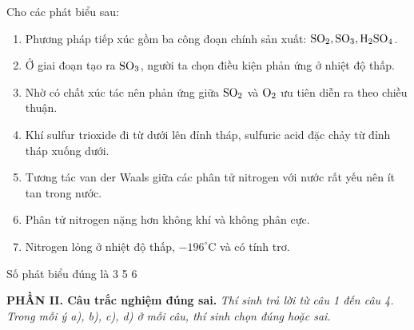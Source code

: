 \documentclass[12pt,a4paper]{article}
\begin{document}
\begin{ex}
Cho các phát biểu sau:
\begin{enumerate}[(1)]
	\item Phương pháp tiếp xúc gồm ba công đoạn chính sản xuất: $\ce{SO2, SO3, H2SO4}$.
	\item Ở giai đoạn tạo ra $\ce{SO3}$, người ta chọn điều kiện phản ứng ở nhiệt độ thấp.
	\item Nhờ có chất xúc tác nên phản ứng giữa $\ce{SO2}$ và $\ce{O2}$ ưu tiên diễn ra theo chiều thuận.
	\item Khí sulfur trioxide đi từ dưới lên đỉnh tháp, sulfuric acid đặc chảy từ đỉnh tháp xuống dưới.
	\item Tương tác van der Waals giữa các phân tử nitrogen với nước rất yếu nên ít tan trong nước.
	\item Phân tử nitrogen nặng hơn không khí và không phân cực.
	\item Nitrogen lỏng ở nhiệt độ thấp, $-196^\circ\text{C}$ và có tính trơ.
\end{enumerate}
Số phát biểu đúng là
\choice
{3}
{}
{5}
{6}

\end{ex}


\vspace{0.3cm}
\noindent\textbf{\large PHẦN II. Câu trắc nghiệm đúng sai.}
\textit{Thí sinh trả lời từ câu 1 đến câu 4. Trong mỗi ý a), b), c), d) ở mỗi câu, thí sinh chọn đúng hoặc sai.}
\vspace{0.2cm}
\end{document}
